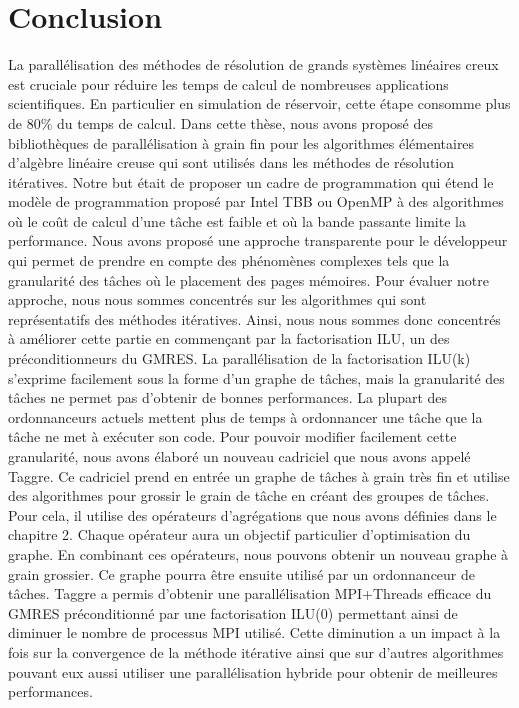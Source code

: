 \section{Conclusion}
%
%
La parallélisation des méthodes de résolution de grands systèmes linéaires creux est cruciale pour réduire les temps de calcul de nombreuses applications scientifiques.
%
En particulier en simulation de réservoir, cette étape consomme plus de 80\% du temps de calcul.
%
Dans cette thèse, nous avons proposé des bibliothèques de parallélisation à grain fin pour les algorithmes élémentaires d'algèbre linéaire creuse qui sont utilisés dans les méthodes de résolution itératives.
%
Notre but était de proposer un cadre de programmation qui étend le modèle de programmation proposé par Intel TBB ou OpenMP à des algorithmes où le coût de calcul d'une tâche est faible et où la bande passante limite la performance.
%
Nous avons proposé une approche transparente pour le développeur qui permet de prendre en compte des phénomènes complexes tels que la granularité des tâches où le placement des pages mémoires.
%
Pour évaluer notre approche, nous nous sommes concentrés sur les algorithmes qui sont représentatifs des méthodes itératives.
%
Ainsi, nous nous sommes donc concentrés à améliorer cette partie en commençant par la factorisation ILU, un des préconditionneurs du GMRES.
%
La parallélisation de la factorisation ILU(k) s'exprime facilement sous la forme d'un graphe de tâches, mais la granularité des tâches ne permet pas d'obtenir de bonnes performances.
%
La plupart des ordonnanceurs actuels mettent plus de temps à ordonnancer une tâche que la tâche ne met à exécuter son code.
%
Pour pouvoir modifier facilement cette granularité, nous avons élaboré un nouveau cadriciel que nous avons appelé Taggre.
%
Ce cadriciel prend en entrée un graphe de tâches à grain très fin et utilise des algorithmes pour grossir le grain de tâche en créant des groupes de tâches.
%
Pour cela, il utilise des opérateurs d'agrégations que nous avons définies dans le chapitre 2.
%
Chaque opérateur aura un objectif particulier d'optimisation du graphe.
%
En combinant ces opérateurs, nous pouvons obtenir un nouveau graphe à grain grossier.
%
Ce graphe pourra être ensuite utilisé par un ordonnanceur de tâches.
%
Taggre a permis d'obtenir une parallélisation MPI+Threads efficace du GMRES préconditionné par une factorisation ILU(0) permettant ainsi de diminuer le nombre de processus MPI utilisé.
%
Cette diminution a un impact à la fois sur la convergence de la méthode itérative ainsi que sur d'autres algorithmes pouvant eux aussi utiliser une parallélisation hybride pour obtenir de meilleures performances.



